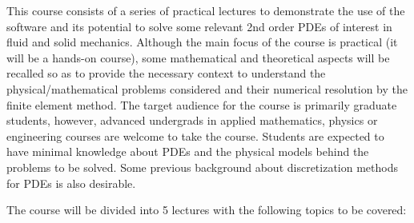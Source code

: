 This course consists of a series of practical lectures to demonstrate the use 
of the software and its potential to solve some relevant 2nd order PDEs 
of interest in fluid and solid mechanics.  
Although the main focus of the course is practical (it will be a hands-on course), some mathematical and theoretical aspects will be recalled so as to provide the necessary context to understand the physical/mathematical problems considered and their numerical resolution by the finite element method. The target audience for the course is primarily graduate students, however, advanced undergrads in applied mathematics, physics or engineering courses are welcome to take the course. Students are expected to have minimal knowledge about PDEs and the physical models behind the problems to be solved. Some previous background about discretization methods for PDEs is also desirable.

The course will be divided into 5 lectures with the following topics to be covered: 

